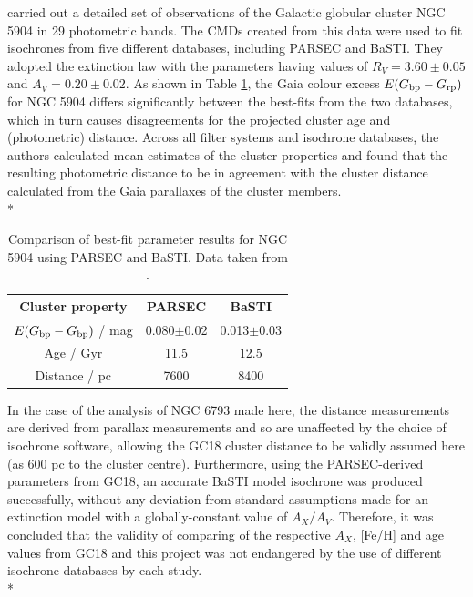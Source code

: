\documentclass[12pt, a4paper]{report}
\begin{document}
\cite{2019MNRAS.483.4949G} carried out a detailed set of observations of the Galactic globular cluster NGC 5904 in 29 photometric bands. The CMDs created from this data were used to fit isochrones from five different databases, including PARSEC and BaSTI. They adopted the \cite{1989ApJ...345..245C} extinction law with the parameters having values of $R_{V} = 3.60\pm0.05$ and $A_{V} = 0.20\pm0.02$. As shown in Table \ref{NGC5904_obs_gontcharov}, the Gaia colour excess $E(G_{\textnormal{bp}} - G_{\textnormal{rp}})$ for NGC 5904 differs significantly between the best-fits from the two databases, which in turn causes disagreements for the projected cluster age and (photometric) distance. Across all filter systems and isochrone databases, the authors calculated mean estimates of the cluster properties and found that the resulting photometric distance to be in agreement with the cluster distance calculated from the Gaia parallaxes of the cluster members.\\*

\begin{table}
\begin{center}
\begin{tabular}{ccc}
\hline
Cluster property & PARSEC & BaSTI \\
\hline
$E(G_{\textnormal{bp}} - G_{\textnormal{bp}})$ / mag & 0.080$\pm$0.02 & 0.013$\pm$0.03 \\
Age / Gyr & 11.5 & 12.5 \\
Distance / pc & 7600 & 8400 \\
\hline
\end{tabular}
\caption{Comparison of best-fit parameter results for NGC 5904 using PARSEC and BaSTI. Data taken from \cite{2019MNRAS.483.4949G}.}
\label{NGC5904_obs_gontcharov}
\end{center}
\end{table}

In the case of the analysis of NGC 6793 made here, the distance measurements are derived from parallax measurements and so are unaffected by the choice of isochrone software, allowing the GC18 cluster distance to be validly assumed here (as 600 pc to the cluster centre). Furthermore, using the PARSEC-derived parameters from GC18, an accurate BaSTI model isochrone was produced successfully, without any deviation from standard assumptions made for an extinction model with a globally-constant value of $A_{X}/A_{V}$. Therefore, it was concluded that the validity of comparing of the respective $A_{X}$, [Fe/H] and age values from GC18 and this project was not endangered by the use of different isochrone databases by each study.\\*
\end{document}
